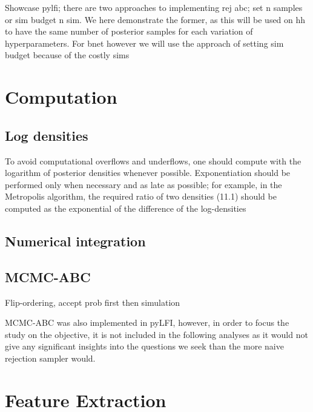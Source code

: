 Showcase pylfi; there are two approaches to implementing rej abc; set n samples or sim budget n sim. We here demonstrate the former, as this will be used on hh to have the same number of posterior samples for each variation of hyperparameters. For bnet however we will use the approach of setting sim budget because of the costly sims

\section{Computation}

\subsection{Log densities}

To avoid computational overflows and underflows, one should compute with the logarithm of posterior densities whenever possible. Exponentiation should be performed only when necessary and as late as possible; for example, in the Metropolis algorithm, the required ratio of two densities (11.1) should be computed as the exponential of the difference of the log-densities \cite[p. 261]{BDA}

\subsection{Numerical integration} 

\subsection{MCMC-ABC}

Flip-ordering, accept prob first then simulation

MCMC-ABC was also implemented in pyLFI, however, in order to focus the study on the objective, it is not included in the following analyses as it would not give any significant insights into the questions we seek than the more naive rejection sampler would. 

\section{Feature Extraction}\label{sec:hh_feature_extract}

